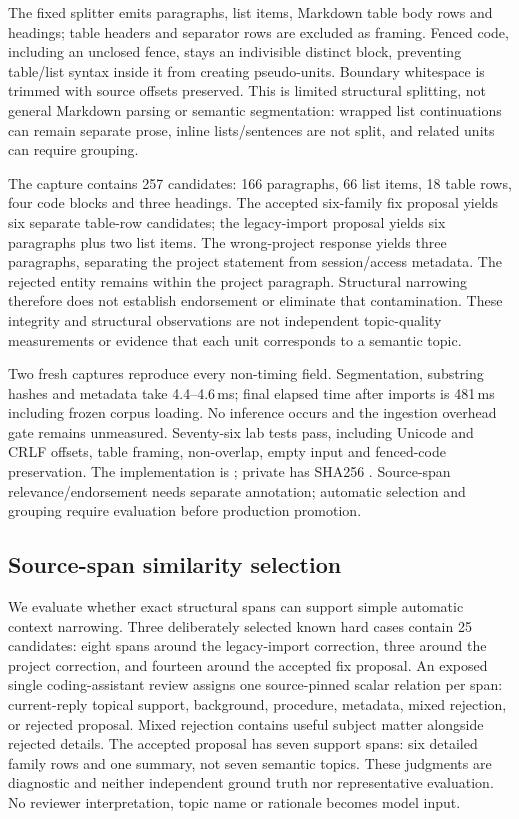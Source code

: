\documentclass[11pt]{article}
\begin{document}
The fixed splitter emits paragraphs, list items, Markdown table body rows and
headings; table headers and separator rows are excluded as framing. Fenced code,
including an unclosed fence, stays an indivisible distinct block, preventing
table/list syntax inside it from creating pseudo-units. Boundary whitespace is
trimmed with source offsets preserved. This is limited structural splitting,
not general Markdown parsing or semantic segmentation: wrapped list continuations
can remain separate prose, inline lists/sentences are not split, and related
units can require grouping.

The capture contains 257 candidates: 166 paragraphs, 66 list items, 18 table rows,
four code blocks and three headings. The accepted six-family fix proposal yields
six separate table-row candidates; the legacy-import proposal yields six
paragraphs plus two list items. The wrong-project response yields three paragraphs,
separating the project statement from session/access metadata. The rejected
entity remains within the project paragraph. Structural narrowing therefore
does not establish endorsement or eliminate that contamination. These integrity
and structural observations are not independent topic-quality measurements or
evidence that each unit corresponds to a semantic topic.

Two fresh captures reproduce every non-timing field. Segmentation, substring
hashes and metadata take 4.4--4.6\,ms; final elapsed time after imports is
481\,ms including frozen corpus loading. No inference occurs and the ingestion
overhead gate remains unmeasured. Seventy-six lab tests pass, including Unicode
and CRLF offsets, table framing, non-overlap, empty input and fenced-code
preservation. The implementation is ;
private  has SHA256
.
Source-span relevance/endorsement needs separate annotation; automatic selection
and grouping require evaluation before production promotion.

\subsection{Source-span similarity selection}
We evaluate whether exact structural spans can support simple automatic context
narrowing. Three deliberately selected known hard cases contain 25 candidates:
eight spans around the legacy-import correction, three around the project
correction, and fourteen around the accepted fix proposal. An exposed single
coding-assistant review assigns one source-pinned scalar relation per span:
current-reply topical support, background, procedure, metadata, mixed rejection,
or rejected proposal. Mixed rejection contains useful subject matter alongside
rejected details. The accepted proposal has seven support spans: six detailed
family rows and one summary, not seven semantic topics. These judgments are
diagnostic and neither independent ground truth nor representative evaluation.
No reviewer interpretation, topic name or rationale becomes model input.
\end{document}
